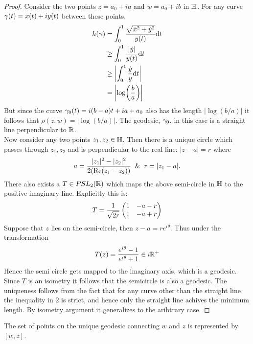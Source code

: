 \begin{proof}
  Consider the two points $z = a_0 + ia$ and $w = a_0 + ib$ in $\mathbb{H}$. For any curve $\gamma(t) = x(t) + iy(t)$ between these points,
  \begin{align}
    h(\gamma) &= \int^1_0 \frac{\sqrt{\dot{x}^2 + \dot{y}^2}}{y(t)} \dd t \nonumber\\
          &\geq \int^1_0 \frac{|\dot{y}|}{y(t)}\dd t \nonumber\\
          &\geq \abs{\int^1_0 \frac{\dot{y}}{y} \dd t} \nonumber \\
          &= \abs{\log(\frac{b}{a})}
  \end{align}
  But since the curve $\gamma_0(t) = i(b-a)t + ia + a_0$ also has the length $|\log(b/a)|$ it follows that $\rho(z,w) = |\log(b/a)|$. The geodesic, $\gamma_0$, in this case is a straight line perpendicular to $\mathbb{R}$.\\

  Now consider any two points $z_1,z_2\in \mathbb{H}$. Then there is a unique circle which passes through $z_1,z_2$ and is perpendicular to the real line: $|z-a| = r$ where
  \begin{align*}
    a = \f{|z_1|^2 - |z_2|^2}{2(\Re(z_1-z_2))} \And r = |z_1 - a|. 
  \end{align*}
  There also exists a $T\in PSL_2(\mathbb{R})$ which maps the above semi-circle in $\mathbb{H}$ to the positive imaginary line. Explicitly this is:
  \begin{align*}
    T = \frac{1}{\sqrt{2r}}\begin{pmatrix}
      1 & -a-r \\ 1 & -a +r 
    \end{pmatrix}
  \end{align*}
  Suppose that $z$ lies on the semi-circle, then $z-a = re^{i\theta}$. Thus under the transformation
  \begin{align*}
    T(z) = \frac{e^{i\theta}-1}{e^{i\theta}+1} \in i\mathbb{R}^+
  \end{align*}
  Hence the semi circle gets mapped to the imaginary axis, which is a geodesic. Since $T$ is an isometry it follows that the semicircle is also a geodesic. The uniqueness follows from the fact that for any curve other than the straight line the inequality in $2$ is strict, and hence only the straight line achives the minimum length. By isometry argument it generalizes to the aribtrary case.
\end{proof}
\begin{definition}
  The set of points on the unique geodesic connecting $w$ and $z$ is represented by $[w,z]$.
\end{definition}
